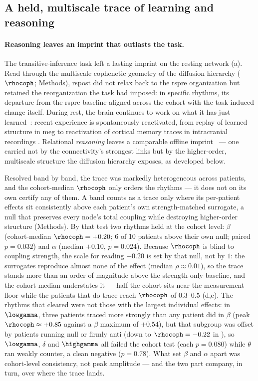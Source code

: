 %
    \subsection{A held, multiscale trace of learning and reasoning}
        \label{ssec:trace}
%
\paragraph{Reasoning leaves an imprint that outlasts the task.}
The transitive-inference task left a lasting imprint on the resting network (a). Read through the multiscale cophenetic geometry of the diffusion hierarchy (\(\rhocoph\); Methods), \acrshort{rspost} did not relax back to the \acrshort{rspre} organization but retained the reorganization the task had imposed: in specific rhythms, its departure from the \acrshort{rspre} baseline aligned across the cohort with the task-induced change itself. During rest, the brain continues to work on what it has just learned~\cite{tambini2010enhanced}: recent experience is spontaneously reactivated, from replay of learned structure in \gls{meg} \cite{liu2019human} to reactivation of cortical memory traces in intracranial recordings \cite{duan2025awake}. Relational \emph{reasoning} leaves a comparable offline imprint~\cite{ellenbogen2007human} --- one carried not by the connectivity's strongest links but by the higher-order, multiscale structure the diffusion hierarchy exposes, as developed below.

Resolved band by band, the trace was markedly heterogeneous across patients, and the cohort-median \(\rhocoph\) only orders the rhythms --- it does not on its own certify any of them. A band counts as a trace only where its per-patient effects sit consistently above each patient's own strength-matched surrogate, a null that preserves every node's total coupling while destroying higher-order structure (Methods). By that test two rhythms held at the cohort level: \(\beta\) (cohort-median \(\rhocoph = +0.20\); 6 of 10 patients above their own null; paired \(p = 0.032\)) and \(\alpha\) (median \(+0.10\), \(p = 0.024\)). Because \(\rhocoph\) is blind to coupling strength, the scale for reading \(+0.20\) is set by that null, not by \(1\): the surrogates reproduce almost none of the effect (median \(\rho \approx 0.01\)), so the trace stands more than an order of magnitude above the strength-only baseline, and the cohort median understates it --- half the cohort sits near the measurement floor while the patients that do trace reach \(\rhocoph\) of \(0.3\)--\(0.5\) (d,e). The rhythms that cleared were not those with the largest individual effects: in \(\lowgamma\), three patients traced more strongly than any patient did in \(\beta\) (peak \(\rhocoph \approx +0.85\) against a \(\beta\) maximum of \(+0.54\)), but that subgroup was offset by patients running null or firmly anti (down to \(\rhocoph = -0.22\) in ), so \(\lowgamma\), \(\delta\) and \(\highgamma\) all failed the cohort test (each \(p = 0.080\)) while \(\theta\) ran weakly counter, a clean negative (\(p = 0.78\)). What set \(\beta\) and \(\alpha\) apart was cohort-level consistency, not peak amplitude --- and the two part company, in turn, over where the trace lands.

